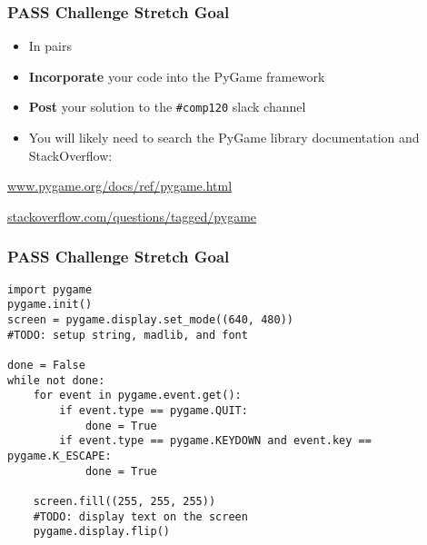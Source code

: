 \begin{frame}[fragile]
	\frametitle{PASS Challenge Stretch Goal}
	
	\begin{itemize}
		\item In pairs
		\item \textbf{Incorporate} your code into the PyGame framework
		\item \textbf{Post} your solution to the \lstinline{#comp120} slack channel
		\item You will likely need to search the PyGame library documentation and StackOverflow:
	\end{itemize}
	
	\vspace{2em}
	\url{www.pygame.org/docs/ref/pygame.html}
	
	\vspace{1em}
	\url{stackoverflow.com/questions/tagged/pygame}
	
\end{frame}

\begin{frame}[fragile]
\frametitle{PASS Challenge Stretch Goal}
	
\begin{lstlisting}
import pygame
pygame.init()
screen = pygame.display.set_mode((640, 480))
#TODO: setup string, madlib, and font

done = False
while not done:
    for event in pygame.event.get():
        if event.type == pygame.QUIT:
            done = True
        if event.type == pygame.KEYDOWN and event.key == pygame.K_ESCAPE:
            done = True

    screen.fill((255, 255, 255))
    #TODO: display text on the screen
    pygame.display.flip()
\end{lstlisting}
	
\end{frame}